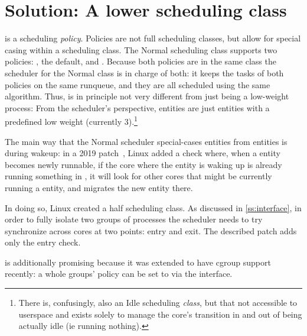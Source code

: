 
\section{Solution: A lower scheduling class}\label{s:idle}



\schedidle{} is a scheduling \textit{policy}. Policies are not full scheduling
classes, but allow for special casing within a scheduling class. The Normal
scheduling class supports two policies: \schednormal{}, the default, and
\schedidle{}. Because both policies are in the same class the scheduler for the
Normal class is in charge of both: it keeps the tasks of both policies on the
same runqueue, and they are all scheduled using the same algorithm. Thus,
\schedidle{} is in principle not very different from just being a low-weight
process: From the scheduler's perspective, \schedidle{} entities are just
entities with a predefined low weight (currently 3).\footnote{There is,
confusingly, also an Idle scheduling \textit{class}, but that not accessible to
userspace and exists solely to manage the core's transition in and out of being
actually idle (ie running nothing).}

The main way that the Normal scheduler special-cases \schedidle{} entities from
\schednormal{} entities is during wakeup: in a 2019 patch~\cite{TODO}, Linux
added a check where, when a \schednormal{} entity becomes newly runnable, if the
core where the entity is waking up is already running something in
\schednormal{}, it will look for other cores that might be currently running a
\schedidle{} entity, and migrates the new entity there.

In doing so, Linux created a half scheduling class. As discussed in
\autoref{ss:interface}, in order to fully isolate two groups of processes the
scheduler needs to try synchronize across cores at two points: entry and exit.
The described patch adds only the entry check.

\schedidle{} is additionally promising because it was extended to have cgroup
support recently\cite{TODO}: a whole groups' policy can be set to \schedidle{}
via the \cgroups{} interface.

